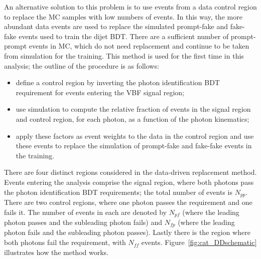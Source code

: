 An alternative solution to this problem is to use events from a data control region 
to replace the MC samples with low numbers of events.
In this way, the more abundant data events are used to replace the simulated prompt-fake and fake-fake 
events used to train the dijet BDT.
There are a sufficient number of prompt-prompt events in MC, 
which do not need replacement and continue to be taken from simulation for the training.
This method is used for the first time in this analysis;
the outline of the procedure is as follows:
\begin{itemize}
\item define a control region by inverting the photon identification BDT requirement 
      for events entering the VBF signal region;
\item use simulation to compute the relative fraction of events in the signal region and control region, 
      for each photon, as a function of the photon kinematics;
\item apply these factors as event weights to the data in the control region 
      and use these events to replace the simulation of prompt-fake and fake-fake events in the training.
\end{itemize}

There are four distinct regions considered in the data-driven replacement method.
Events entering the analysis comprise the signal region, 
where both photons pass the photon identification BDT requirements;
the total number of events is $N_{pp}$.
There are two control regions, where one photon passes the requirement and one fails it.
The number of events in each are denoted by $N_{pf}$ 
(where the leading photon passes and the subleading photon fails) and $N_{fp}$ 
(where the leading photon fails and the subleading photon passes).
Lastly there is the region where both photons fail the requirement, with $N_{ff}$ events.
Figure~\ref{fig:cat_DDschematic} illustrates how the method works.

